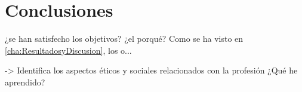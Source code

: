 
\chapter{Conclusiones}
\label{cha:Conclusiones}

    ¿se han satisfecho los objetivos? ¿el porqué? Como se ha visto en \ref{cha:ResultadosyDiscusion}, los o...

    -> Identifica los aspectos éticos y sociales relacionados con la profesión
    ¿Qué he aprendido?


\newpage
